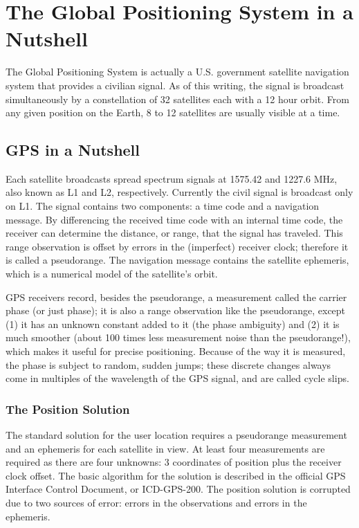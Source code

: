 
\chapter{The Global Positioning System in a Nutshell}

The Global Positioning System is actually a U.S. government satellite navigation system that provides a civilian signal. As of this writing, the signal is broadcast simultaneously by a constellation of 32 satellites each with a 12 hour orbit. From any given position on the Earth, 8 to 12 satellites are usually visible at a time.

\section{GPS in a Nutshell}

Each satellite broadcasts spread spectrum signals at 1575.42 and 1227.6 MHz, also known as L1 and L2, respectively. Currently the civil signal is broadcast only on L1. The signal contains two components: a time code and a navigation message. By differencing the received time code with an internal time code, the receiver can determine the distance, or range, that the signal has traveled. This range observation is offset by errors in the (imperfect) receiver clock; therefore it is called a pseudorange. The navigation message contains the satellite ephemeris, which is a numerical model of the satellite's orbit.

GPS receivers record, besides the pseudorange, a measurement called the carrier phase (or just phase); it is also a range observation like the pseudorange, except (1) it has an unknown constant added to it (the phase ambiguity) and (2) it is much smoother (about 100 times less measurement noise than the pseudorange!), which makes it useful for precise positioning. Because of the way it is measured, the phase is subject to random, sudden jumps; these discrete changes always come in multiples of the wavelength of the GPS signal, and are called cycle slips.


\subsection{The Position Solution}

The standard solution for the user location requires a pseudorange measurement and an ephemeris for each satellite in view. At least four measurements are required as there are four unknowns: 3 coordinates of position plus the receiver clock offset. The basic algorithm for the solution is described in the official GPS Interface Control Document, or ICD-GPS-200. The position solution is corrupted due to two sources of error: errors in the observations and errors in the ephemeris.


